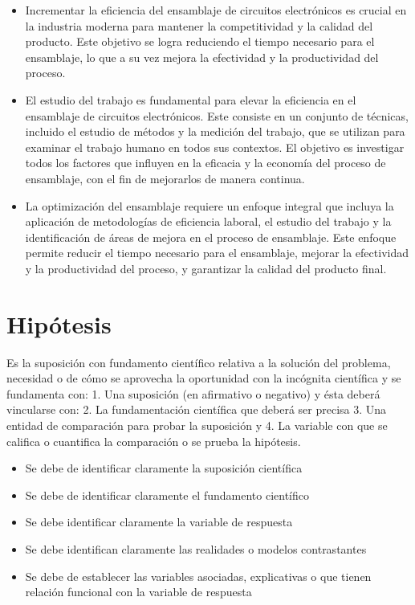     
    \begin{itemize}
        \item Incrementar la eficiencia del ensamblaje de circuitos electrónicos es crucial en la industria moderna para mantener la competitividad y la calidad del producto. Este objetivo se logra reduciendo el tiempo necesario para el ensamblaje, lo que a su vez mejora la efectividad y la productividad del proceso.
        \item El estudio del trabajo es fundamental para elevar la eficiencia en el ensamblaje de circuitos electrónicos. Este consiste en un conjunto de técnicas, incluido el estudio de métodos y la medición del trabajo, que se utilizan para examinar el trabajo humano en todos sus contextos. El objetivo es investigar todos los factores que influyen en la eficacia y la economía del proceso de ensamblaje, con el fin de mejorarlos de manera continua.
        \item  La optimización del ensamblaje requiere un enfoque integral que incluya la aplicación de metodologías de eficiencia laboral, el estudio del trabajo y la identificación de áreas de mejora en el proceso de ensamblaje. Este enfoque permite reducir el tiempo necesario para el ensamblaje, mejorar la efectividad y la productividad del proceso, y garantizar la calidad del producto final.
        \cite{freivalds2014ingenieria}
    \end{itemize}
    \section{Hipótesis}
    
    Es la suposición con fundamento científico relativa a la solución del problema, necesidad o de cómo se aprovecha la oportunidad con la incógnita científica y se fundamenta con: 1. Una suposición (en afirmativo o negativo) y ésta deberá vincularse con:
    2. La fundamentación científica que deberá ser precisa 3. Una entidad de comparación para probar la suposición y
    4. La variable con que se califica o cuantifica la comparación o se prueba la hipótesis.
    
    \begin{itemize}
        \item Se debe de identificar claramente la suposición científica
        \item Se debe de identificar claramente el fundamento científico
        \item Se debe identificar claramente la variable de respuesta
        \item Se debe identifican claramente las realidades o modelos contrastantes
        \item Se debe de establecer las variables asociadas, explicativas o que tienen relación funcional con la variable de respuesta
    \end{itemize}
